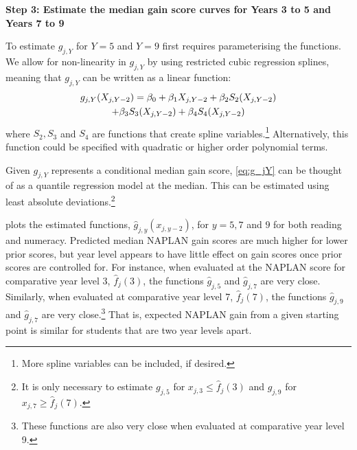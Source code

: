 \textbf{Step 3: Estimate the median gain score curves for Years 3 to 5 and Years 7 to 9} 
\nopagebreak

To estimate $g_{j,Y}$ for $Y=5$ and $Y=9$ first requires parameterising the functions. We allow for non-linearity in $g_{j,Y}$ by using restricted cubic regression splines, meaning that $g_{j,Y}$ can be written as a linear function:
\begin{equation} \begin{array}{c}
g_{j,Y}(X_{j,Y-2}) = \beta_{0} + \beta_{1}X_{j,Y-2} + \beta_{2}S_{2}(X_{j,Y-2}) \vspace{0.3em}\\
+ \beta_{3}S_{3}(X_{j,Y-2}) + \beta_{4}S_{4}(X_{j,Y-2}) \label{eq:g_jY}
\end{array} \end{equation}
where $S_{2},S_{3}$ and $S_{4}$ are functions that create spline variables.\footnote{More spline variables can be included, if desired.} Alternatively, this function could be specified with quadratic or higher order polynomial terms.

Given $g_{j,Y}$ represents a conditional median gain score, \cref{eq:g_jY} can be thought of as a quantile regression model at the median. This can be estimated using least absolute deviations.\footnote{It is only necessary to estimate $g_{j,5}$ for $x_{j,3}\leq \widehat{f}_{j}(3)$ and $g_{j,9}$ for $x_{j,7} \geq \widehat{f}_{j}(7)$.}

 plots the estimated functions, $\widehat{g}_{j,y}\left(x_{j,y-2}\right)$, for $y=5,7$ and $9$ for both reading and numeracy. Predicted median NAPLAN gain scores are much higher for lower prior scores, but year level appears to have little effect on gain scores once prior scores are controlled for. For instance, when evaluated at the NAPLAN score for comparative year level 3, $\widehat{f}_{j}\left(3\right)$, the functions $\widehat{g}_{j,5}$ and $\widehat{g}_{j,7}$ are very close. Similarly, when evaluated at comparative year level 7, $\widehat{f}_{j}\left(7\right)$, the functions $\widehat{g}_{j,9}$ and $\widehat{g}_{j,7}$ are very close.\footnote{These functions are also very close when evaluated at comparative year level 9.} That is, expected NAPLAN gain from a given starting point is similar for students that are two year levels apart.

